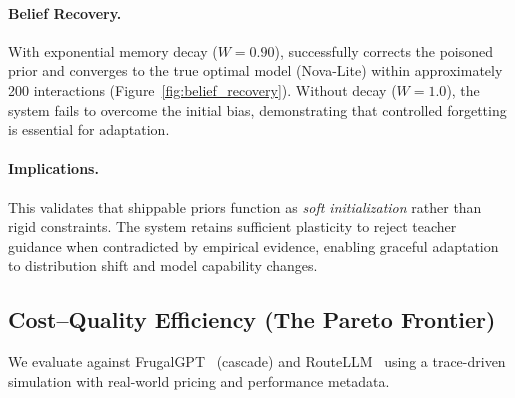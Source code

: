 \paragraph{Belief Recovery.} With exponential memory decay ($W=0.90$), \ours{} successfully corrects the poisoned prior and converges to the true optimal model (Nova-Lite) within approximately 200 interactions (Figure~\ref{fig:belief_recovery}). Without decay ($W=1.0$), the system fails to overcome the initial bias, demonstrating that controlled forgetting is essential for adaptation.

\paragraph{Implications.} This validates that shippable priors function as \emph{soft initialization} rather than rigid constraints. The system retains sufficient plasticity to reject teacher guidance when contradicted by empirical evidence, enabling graceful adaptation to distribution shift and model capability changes.


\subsection{Cost--Quality Efficiency (The Pareto Frontier)}
\label{sec:rq3}

We evaluate \ours{} against FrugalGPT~\cite{chen2023frugalgpt} (cascade) and RouteLLM~\cite{ong2024routellm} using a trace-driven simulation with real-world pricing and performance metadata.

\begin{table}[t]
\centering
\small
\caption{\textbf{SOTA Comparison.} Standard mode is the cost leader; Hybrid mode approaches cascading accuracy while operating over an 80+ model pool without fixed chains.}
\label{tab:sota_comparison}
\end{table}

